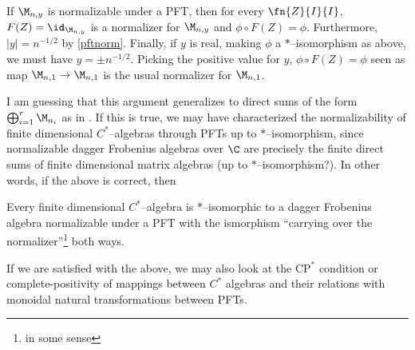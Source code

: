 If $\M_{n, y}$ is normalizable under a PFT, then for every $\fn{Z}{I}{I}$,
$F(Z) = \id_{\M_{n, y}}$ is a normalizer for $\M_{n, y}$ and
$\phi \circ F(Z) = \phi$. Furthermore, $|y| = n^{-1/2}$ by \ref{pftnorm}.
Finally, if $y$ is real, making $\phi$ a $*$--isomorphism as above, we must have
$y = \pm n^{-1/2}$. Picking the positive value for $y$,
$\phi \circ F(Z) = \phi$ seen as map $\M_{n, 1} \to \M_{n, 1}$ is the usual
normalizer for $\M_{n, 1}$.

I am guessing that this argument generalizes to direct sums of the form
$\bigoplus_{i = 1}^r \M_{n_i}$ as in \cite[10]{CatQChan}.  If this is true, we
may have characterized the normalizability of finite dimensional $C^*$--algebras
through PFTs up to $*$--isomorphism, since normalizable dagger Frobenius
algebras over $\C$ are precisely the finite direct sums of finite dimensional
matrix algebras (up to $*$--isomorphism?). In other words, if the above is
correct, then
\begin{thm}
Every finite dimensional $C^*$--algebra is $*$--isomorphic to a dagger Frobenius
algebra normalizable under a PFT with the ismorphism ``carrying over the
normalizer''\footnote{in some sense} both ways.
\end{thm}

If we are satisfied with the above, we may also look at the $\text{CP}^*$
condition or complete-positivity of mappings between $C^*$ algebras and their
relations with monoidal natural transformations between PFTs.


